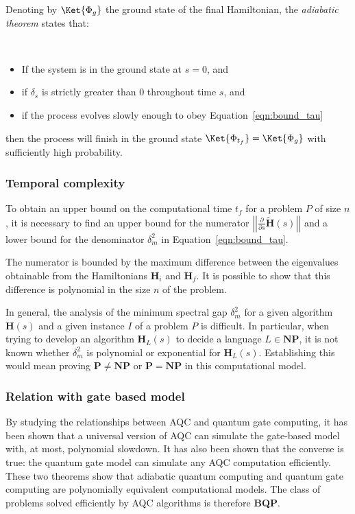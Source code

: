 Denoting by $\Ket{\Phi_g}$ the ground state of the final Hamiltonian, the \emph{adiabatic theorem} states that:
\begin{theorem}\ 
	\begin{itemize}
		\item If the system is in the ground state at $s = 0$, and
		\item if $\delta_s$ is strictly greater than $0$ throughout time $s$, and
		\item if the process evolves slowly enough to obey Equation~\ref{eqn:bound_tau}
	\end{itemize}
	then the process will finish in the ground state $\Ket{\Phi_{t_f}} = \Ket{\Phi_g}$ with sufficiently high probability.
\end{theorem}

\subsubsection*{Temporal complexity}
To obtain an upper bound on the computational time $t_f$ for a problem $P$ of size $n$, it is necessary to find an upper bound for the numerator $\left|\left|\frac{\partial}{\partial s} \tilde{\mathbf{H}}(s)\right|\right|$ and a lower bound for the denominator $\delta_m^2$ in Equation~\ref{eqn:bound_tau}.

The numerator is bounded by the maximum difference between the eigenvalues obtainable from the Hamiltonians $\mathbf{H}_i$ and $\mathbf{H}_f$. It is possible to show that this difference is polynomial in the size $n$ of the problem.

In general, the analysis of the minimum spectral gap $\delta_m^2$ for a given algorithm $\mathbf{H}(s)$ and a given instance $I$ of a problem $P$ is difficult. In particular, when trying to develop an algorithm $\mathbf{H}_{L}(s)$ to decide a language $L \in \textbf{NP}$, it is not known whether $\delta_m^2$ is polynomial or exponential for $\mathbf{H}_{L}(s)$. Establishing this would mean proving $\mathbf{P} \neq \textbf{NP}$ or $\mathbf{P} = \textbf{NP}$ in this computational model.

\subsubsection*{Relation with gate based model}
By studying the relationships between AQC and quantum gate computing, it has been shown that a universal version of AQC can simulate the gate-based model with, at most, polynomial slowdown. It has also been shown that the converse is true: the quantum gate model can simulate any AQC computation efficiently. These two theorems show that adiabatic quantum computing and quantum gate computing are polynomially equivalent computational models. The class of problems solved efficiently by AQC algorithms is therefore \textbf{BQP}.

